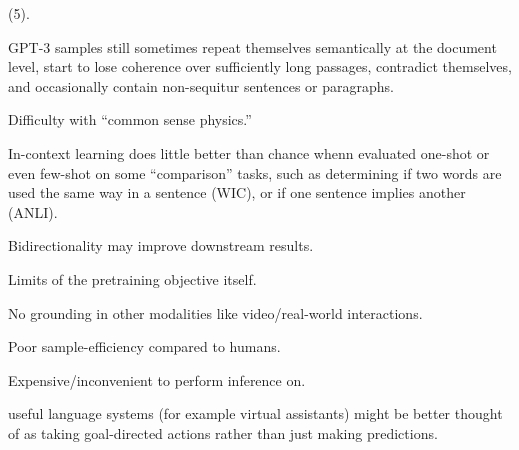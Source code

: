 \documentclass[11pt]{article}
\begin{document}
 (5). 
\begin{myquote}
    GPT-3 samples still sometimes repeat themselves semantically at the document level, start to lose coherence over sufficiently long passages, contradict themselves, and occasionally contain non-sequitur sentences or paragraphs.
\end{myquote}
\begin{compactitem}
    \item Difficulty with ``common sense physics.''
    \item In-context learning does little better than chance whenn evaluated one-shot or even few-shot on some ``comparison'' tasks, such as determining if two words are used the same way in a sentence (WIC), or if one sentence implies another (ANLI).
    \item Bidirectionality may improve downstream results.
    \item Limits of the pretraining objective itself.
    \item No grounding in other modalities like video/real-world interactions.
    \item Poor sample-efficiency compared to humans.
    \item Expensive/inconvenient to perform inference on.
\end{compactitem}

\begin{myquote}
    \textellipsis useful language systems (for example virtual assistants) might be better thought of as taking goal-directed actions rather than just making predictions.
\end{myquote}
\end{document}
